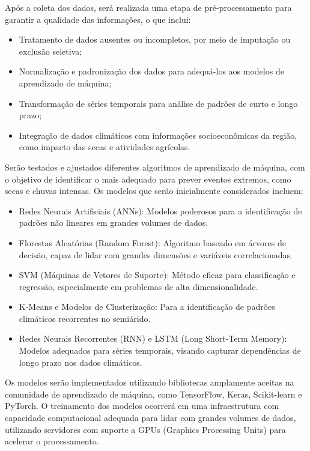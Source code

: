 \documentclass{projetodepesquisa} %
\begin{document}
	\label{sec:limpeza_preprocessamento_dados}
	Após a coleta dos dados, será realizada uma etapa de pré-processamento para garantir a qualidade das informações, o que inclui:
	
	\begin{itemize}
		\item Tratamento de dados ausentes ou incompletos, por meio de imputação ou exclusão seletiva;
		\item Normalização e padronização dos dados para adequá-los aos modelos de aprendizado de máquina;
		\item Transformação de séries temporais para análise de padrões de curto e longo prazo;
		\item Integração de dados climáticos com informações socioeconômicas da região, como impacto das secas e atividades agrícolas.
	\end{itemize}
	
	\label{sec:selecao_implementacao_algoritmos}
	\label{sec:definicao_modelos_preditivos}
	Serão testados e ajustados diferentes algoritmos de aprendizado de máquina, com o objetivo de identificar o mais adequado para prever eventos extremos, como secas e chuvas intensas. Os modelos que serão inicialmente considerados incluem:
	
	\begin{itemize}
		\item Redes Neurais Artificiais (ANNs): Modelos poderosos para a identificação de padrões não lineares em grandes volumes de dados.
		\item Florestas Aleatórias (Random Forest): Algoritmo baseado em árvores de decisão, capaz de lidar com grandes dimensões e variáveis correlacionadas.
		\item SVM (Máquinas de Vetores de Suporte): Método eficaz para classificação e regressão, especialmente em problemas de alta dimensionalidade.
		\item K-Means e Modelos de Clusterização: Para a identificação de padrões climáticos recorrentes no semiárido.
		\item Redes Neurais Recorrentes (RNN) e LSTM (Long Short-Term Memory): Modelos adequados para séries temporais, visando capturar dependências de longo prazo nos dados climáticos.
	\end{itemize}
	
	\label{sec:implementacao_treinamento_modelos}
	Os modelos serão implementados utilizando bibliotecas amplamente aceitas na comunidade de aprendizado de máquina, como TensorFlow, Keras, Scikit-learn e PyTorch. O treinamento dos modelos ocorrerá em uma infraestrutura com capacidade computacional adequada para lidar com grandes volumes de dados, utilizando servidores com suporte a GPUs (Graphics Processing Units) para acelerar o processamento.
	
\end{document}
